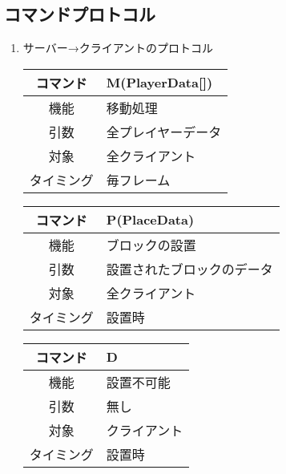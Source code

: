 \documentclass{jarticle}
\begin{document}
\subsection{コマンドプロトコル}

\begin{enumerate}
    \item サーバー→クライアントのプロトコル
    \begin{table}[H]
        \label{table:command1-1}
        \begin{center}
            \begin{tabular}{|c||p{30em}|}\hline
                コマンド&M(PlayerData[])\\\hline
                機能&移動処理\\
                引数&全プレイヤーデータ\\
                対象&全クライアント\\
                タイミング&毎フレーム\\\hline
            \end{tabular}
        \end{center}
    \end{table}
    \begin{table}[H]
        \label{table:command1-2}
        \begin{center}
            \begin{tabular}{|c||p{30em}|}\hline
                コマンド&P(PlaceData)\\\hline
                機能&ブロックの設置\\
                引数&設置されたブロックのデータ\\
                対象&全クライアント\\
                タイミング&設置時\\\hline
            \end{tabular}
        \end{center}
    \end{table}
    \begin{table}[H]
        \label{table:command1-3}
        \begin{center}
            \begin{tabular}{|c||p{30em}|}\hline
                コマンド&D\\\hline
                機能&設置不可能\\
                引数&無し\\
                対象&クライアント\\
                タイミング&設置時\\\hline

\end{tabular}
\end{center}
\end{table}
\end{enumerate}
\end{document}
